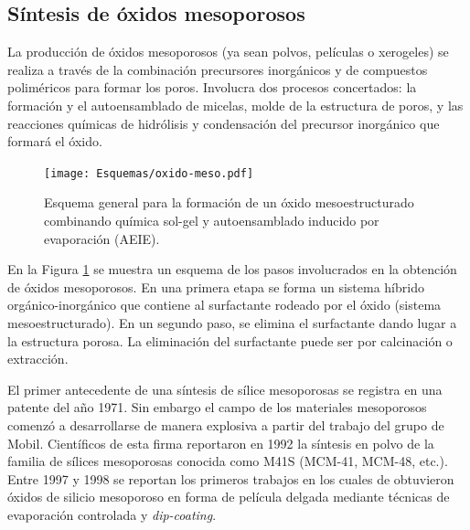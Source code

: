 	\subsection{Síntesis de óxidos mesoporosos} 

	 La producción de óxidos mesoporosos (ya sean polvos, películas o xerogeles) se realiza a través de la combinación precursores inorgánicos y de compuestos poliméricos para formar los poros. Involucra dos procesos concertados: la formación y el autoensamblado de micelas, molde de la estructura de poros, y las reacciones químicas de hidrólisis y condensación del precursor inorgánico que formará el óxido. 

				\begin{figure}[h!]
 				\begin{center}
 				\texttt{[image: Esquemas/oxido-meso.pdf]}
 				\caption[Esquema general para la formación de un óxido mesoestructurado]{Esquema general para la formación de un óxido mesoestructurado combinando química sol-gel y autoensamblado inducido por evaporación (AEIE).}
 		   		\label{fig:oxmeso}
 		    	\end{center}
 		    	\end{figure}

	 En la Figura \ref{fig:oxmeso} se muestra un esquema de los pasos involucrados en la obtención de óxidos mesoporosos. En una primera etapa se forma un sistema híbrido orgánico-inorgánico que contiene al surfactante rodeado por el óxido (sistema mesoestructurado). En un segundo paso, se elimina el surfactante dando lugar a la estructura porosa. La eliminación del surfactante puede ser por calcinación o extracción.
 

     El primer antecedente de una síntesis de sílice mesoporosas se registra en una patente del año 1971. Sin embargo el campo de los materiales mesoporosos comenzó a desarrollarse de manera explosiva a partir del trabajo del grupo de Mobil. Científicos de esta firma reportaron en 1992 la síntesis en polvo de la familia de sílices mesoporosas conocida como M41S (MCM-41, MCM-48, etc.). Entre 1997 y 1998 se reportan los primeros trabajos en los cuales de obtuvieron óxidos de silicio mesoporoso en forma de película delgada mediante técnicas de evaporación controlada y \textit{dip-coating}.\cite{Lu1997,Zhao1998a,Zhao1998,Brinker1999} 


